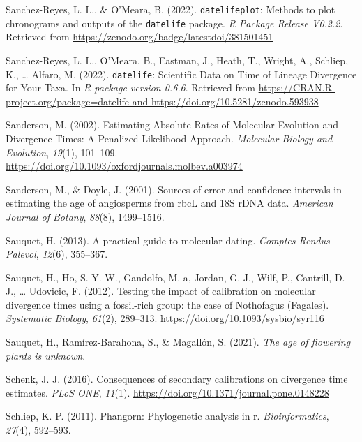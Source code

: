 \documentclass[english,man]{apa6}
\begin{document}
\leavevmode\hypertarget{ref-datelifeplot}{}%
Sanchez-Reyes, L. L., \& O'Meara, B. (2022). \texttt{datelifeplot}: Methods to plot chronograms and outputs of the \texttt{datelife} package. \emph{R Package Release V0.2.2}. Retrieved from \url{https://zenodo.org/badge/latestdoi/381501451}

\leavevmode\hypertarget{ref-sanchez2022}{}%
Sanchez-Reyes, L. L., O'Meara, B., Eastman, J., Heath, T., Wright, A., Schliep, K., \ldots{} Alfaro, M. (2022). \texttt{datelife}: Scientific Data on Time of Lineage Divergence for Your Taxa. In \emph{R package version 0.6.6}. Retrieved from \href{https://CRAN.R-project.org/package=datelife\%20and\%20https://doi.org/10.5281/zenodo.593938}{https://CRAN.R-project.org/package=datelife and https://doi.org/10.5281/zenodo.593938}

\leavevmode\hypertarget{ref-sanderson2002}{}%
Sanderson, M. (2002). Estimating Absolute Rates of Molecular Evolution and Divergence Times: A Penalized Likelihood Approach. \emph{Molecular Biology and Evolution}, \emph{19}(1), 101--109. \url{https://doi.org/10.1093/oxfordjournals.molbev.a003974}

\leavevmode\hypertarget{ref-sanderson2001sources}{}%
Sanderson, M., \& Doyle, J. (2001). Sources of error and confidence intervals in estimating the age of angiosperms from rbcL and 18S rDNA data. \emph{American Journal of Botany}, \emph{88}(8), 1499--1516.

\leavevmode\hypertarget{ref-sauquet2013practical}{}%
Sauquet, H. (2013). A practical guide to molecular dating. \emph{Comptes Rendus Palevol}, \emph{12}(6), 355--367.

\leavevmode\hypertarget{ref-sauquet2012testing}{}%
Sauquet, H., Ho, S. Y. W., Gandolfo, M. a, Jordan, G. J., Wilf, P., Cantrill, D. J., \ldots{} Udovicic, F. (2012). Testing the impact of calibration on molecular divergence times using a fossil-rich group: the case of Nothofagus (Fagales). \emph{Systematic Biology}, \emph{61}(2), 289--313. \url{https://doi.org/10.1093/sysbio/syr116}

\leavevmode\hypertarget{ref-sauquet2021age}{}%
Sauquet, H., Ramírez-Barahona, S., \& Magallón, S. (2021). \emph{The age of flowering plants is unknown}.

\leavevmode\hypertarget{ref-schenk2016sec}{}%
Schenk, J. J. (2016). Consequences of secondary calibrations on divergence time estimates. \emph{PLoS ONE}, \emph{11}(1). \url{https://doi.org/10.1371/journal.pone.0148228}

\leavevmode\hypertarget{ref-schliep2011phangorn}{}%
Schliep, K. P. (2011). Phangorn: Phylogenetic analysis in r. \emph{Bioinformatics}, \emph{27}(4), 592--593.
\end{document}
